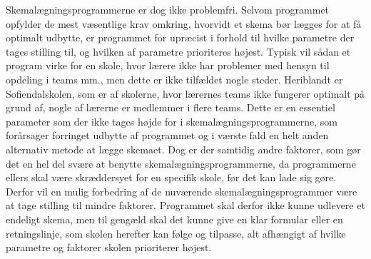 Skemalægningsprogrammerne er dog ikke problemfri. Selvom programmet opfylder de mest væsentlige krav omkring, hvorvidt et skema bør lægges for at få optimalt udbytte, er programmet for upræcist i forhold til hvilke parametre der tages stilling til, og hvilken af parametre prioriteres højest. Typisk vil sådan et program virke for en skole, hvor lærere ikke har problemer med hensyn til opdeling i teams mm., men dette er ikke tilfældet nogle steder. Heriblandt er Sofiendalskolen, som er af skolerne, hvor lærernes teams ikke fungerer optimalt på grund af, nogle af lærerne er medlemmer i flere teams. Dette er en essentiel parameter som der ikke tages højde for i skemalægningsprogrammerne, som forårsager forringet udbytte af programmet og i værste fald en helt anden alternativ metode at lægge skemaet. Dog er der samtidig andre faktorer, som gør det en hel del svære at benytte skemalægningsprogrammerne, da programmerne ellers skal være skræddersyet for en specifik skole, før det kan lade sig gøre.
Derfor vil en mulig forbedring af de nuværende skemalægningsprogrammer være at tage stilling til mindre faktorer. Programmet skal derfor ikke kunne udlevere et endeligt skema, men til gengæld skal det kunne give en klar formular eller en retningslinje, som skolen herefter kan følge og tilpasse, alt afhængigt af hvilke parametre og faktorer skolen prioriterer højest. 
